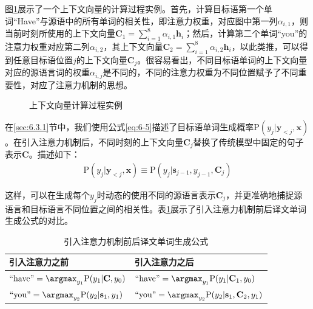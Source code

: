 \parinterval 图\ref{fig:6-25}展示了一个上下文向量的计算过程实例。首先，计算目标语第一个单词``Have''与源语中的所有单词的相关性，即注意力权重，对应图中第一列$\alpha_{i,1}$，则当前时刻所使用的上下文向量$\mathbf{C}_1 = \sum_{i=1}^8 \alpha_{i,1} \mathbf{h}_i$；然后，计算第二个单词``you''的注意力权重对应第二列$\alpha_{i,2}$，其上下文向量$\mathbf{C}_2 = \sum_{i=1}^8 \alpha_{i,2} \mathbf{h}_i$，以此类推，可以得到任意目标语位置$j$的上下文向量$\mathbf{C}_j$。很容易看出，不同目标语单词的上下文向量对应的源语言词的权重$\alpha_{i,j}$是不同的，不同的注意力权重为不同位置赋予了不同重要性，对应了注意力机制的思想。

\begin{figure}[htp]
\centering

\caption{上下文向量计算过程实例}
\label{fig:6-25}
\end{figure}

\parinterval 在\ref{sec:6.3.1}节中，我们使用公式\ref{eq:6-5}描述了目标语单词生成概率P$(y_j | \mathbf{y}_{<j},\mathbf{x})$。在引入注意力机制后，不同时刻的上下文向量$\mathbf{C}_j$替换了传统模型中固定的句子表示$\mathbf{C}$。描述如下：
\begin{eqnarray}
\textrm{P} (y_j | \mathbf{y}_{<j},\mathbf{x}) \equiv \textrm{P} (y_j | \mathbf{s}_{j-1},y_{j-1},\mathbf{C}_j )
\label{eq:6-26}
\end{eqnarray}

\parinterval 这样，可以在生成每个$y_j$时动态的使用不同的源语言表示$\mathbf{C}_j$，并更准确地捕捉源语言和目标语言不同位置之间的相关性。表\ref{tab:6-7}展示了引入注意力机制前后译文单词生成公式的对比。

\begin{table}[htp]
\centering
\caption{引入注意力机制前后译文单词生成公式}
\label{tab:6-7}
\begin{tabular}{ l | l }
\rule{0pt}{13pt}	引入注意力之前			&引入注意力之后 \\ \hline
\rule{0pt}{16pt}	$\textrm{``have''} = \argmax_{y_1}\mathrm{P}(y_1 | \mathbf{C} , y_0)$		&$\textrm{``have''} = \argmax_{y_1}\mathrm{P}(y_1 | \mathbf{C}_1 , y_0)$	\\
\rule{0pt}{16pt}	$\textrm{``you''} = \argmax_{y_2}\mathrm{P}(y_2 | \mathbf{s}_1 , y_1)$			&$\textrm{``you''} = \argmax_{y_2}\mathrm{P}(y_2 | \mathbf{s}_1, \mathbf{C}_2 , y_1)$	\\
\end{tabular}
\end{table}

